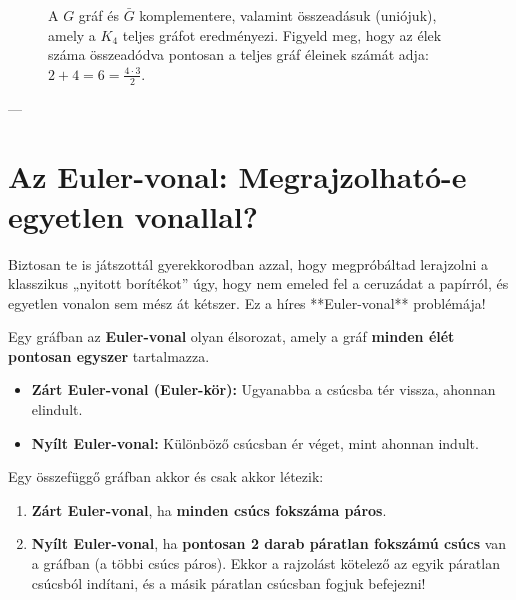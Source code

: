 \documentclass[a4paper,12pt]{article}
\newcommand{\textbfr}[1]{\textbf{\textcolor{bvred}{#1}}} %
\theoremstyle{definition} %
\begin{document}
\begin{figure}[H]
    \caption{A $G$ gráf és $\bar{G}$ komplementere, valamint összeadásuk (uniójuk), amely a $K_4$ teljes gráfot eredményezi. Figyeld meg, hogy az élek száma összeadódva pontosan a teljes gráf éleinek számát adja: $2 + 4 = 6 = \frac{4 \cdot 3}{2}$.}
    \label{fig:complement_graph}
\end{figure}

---

\section{Az Euler-vonal: Megrajzolható-e egyetlen vonallal?}

Biztosan te is játszottál gyerekkorodban azzal, hogy megpróbáltad lerajzolni a klasszikus „nyitott borítékot” úgy, hogy nem emeled fel a ceruzádat a papírról, és egyetlen vonalon sem mész át kétszer. Ez a híres **Euler-vonal** problémája!

\begin{definiciodoboz}
Egy gráfban az \textbf{Euler-vonal} olyan élsorozat, amely a gráf \textbfr{minden élét pontosan egyszer} tartalmazza.
\begin{itemize}
    \item \textbf{Zárt Euler-vonal (Euler-kör):} Ugyanabba a csúcsba tér vissza, ahonnan elindult.
    \item \textbf{Nyílt Euler-vonal:} Különböző csúcsban ér véget, mint ahonnan indult.
\end{itemize}
\end{definiciodoboz}

\begin{teteldoboz}
Egy összefüggő gráfban akkor és csak akkor létezik:
\begin{enumerate}
    \item \textbf{Zárt Euler-vonal}, ha \textbfr{minden csúcs fokszáma páros}.
    \item \textbf{Nyílt Euler-vonal}, ha \textbfr{pontosan 2 darab páratlan fokszámú csúcs} van a gráfban (a többi csúcs páros). Ekkor a rajzolást kötelező az egyik páratlan csúcsból indítani, és a másik páratlan csúcsban fogjuk befejezni!
\end{enumerate}
\end{teteldoboz}
\end{document}
